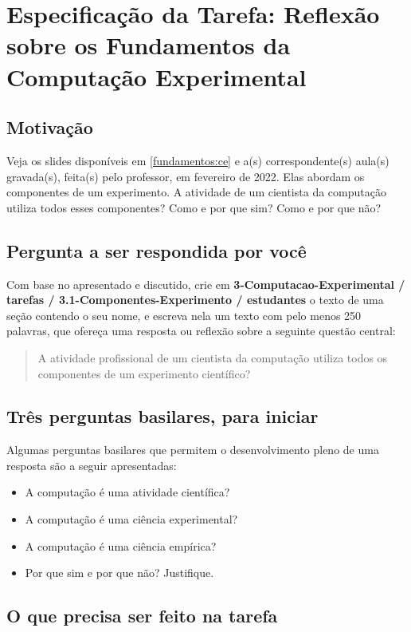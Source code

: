 \section{Especificação da Tarefa: Reflexão sobre os Fundamentos da Computação Experimental}

\subsection{Motivação}

Veja os slides disponíveis em \ref{fundamentos:ce} e a(s) correspondente(s) aula(s) gravada(s), feita(s) pelo professor, em fevereiro de 2022. Elas abordam os componentes de um experimento. A atividade de um cientista da computação utiliza todos esses componentes? Como e por que sim? Como e por que não? 

\subsection{Pergunta a ser respondida por você}

Com base no apresentado e discutido, crie em \textbf{3-Computacao-Experimental / tarefas / 3.1-Componentes-Experimento / estudantes} o texto de uma seção contendo o seu nome, e escreva nela um texto com pelo menos 250 palavras, que ofereça uma resposta ou reflexão sobre a seguinte questão central:
\begin{quote}
A atividade profissional de um cientista da computação utiliza todos os componentes de um experimento científico?
\end{quote}


\subsection{Três perguntas basilares, para iniciar}

Algumas perguntas basilares que permitem o desenvolvimento pleno de uma resposta são a seguir apresentadas:
\begin{itemize}
    \item A computação é uma atividade científica? 
    \item A computação é uma ciência experimental? 
    \item A computação é uma ciência empírica? 
    \item Por que sim e por que não? 
Justifique. 
\end{itemize}

\subsection{O que precisa ser feito na tarefa}

